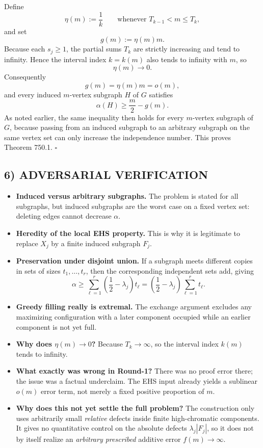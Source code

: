 Define
\[
\eta(m):=\frac1k\qquad\text{whenever }T_{k-1}<m\le T_k,
\]
and set
\[
g(m):=\eta(m)m.
\]
Because each $s_j\ge 1$, the partial sums $T_k$ are strictly increasing and tend to infinity. Hence the interval index $k=k(m)$ also tends to infinity with $m$, so
\[
\eta(m)\to 0.
\]
Consequently
\[
g(m)=\eta(m)m=o(m),
\]
and every induced $m$-vertex subgraph $H$ of $G$ satisfies
\[
\alpha(H)\ge \frac m2-g(m).
\]
As noted earlier, the same inequality then holds for every $m$-vertex subgraph of $G$, because passing from an induced subgraph to an arbitrary subgraph on the same vertex set can only increase the independence number. This proves Theorem 750.1. \hfill $\square$

\subsection*{6) ADVERSARIAL VERIFICATION}

\begin{itemize}
\item \textbf{Induced versus arbitrary subgraphs.} The problem is stated for all subgraphs, but induced subgraphs are the worst case on a fixed vertex set: deleting edges cannot decrease $\alpha$.
\item \textbf{Heredity of the local EHS property.} This is why it is legitimate to replace $X_j$ by a finite induced subgraph $F_j$.
\item \textbf{Preservation under disjoint union.} If a subgraph meets different copies in sets of sizes $t_1,\dots,t_r$, then the corresponding independent sets add, giving
\[
\alpha\ge \sum_{\ell=1}^r\left(\frac12-\lambda_j\right)t_\ell
=\left(\frac12-\lambda_j\right)\sum_{\ell=1}^r t_\ell.
\]
\item \textbf{Greedy filling really is extremal.} The exchange argument excludes any maximizing configuration with a later component occupied while an earlier component is not yet full.
\item \textbf{Why does $\eta(m)\to 0$?} Because $T_k\to\infty$, so the interval index $k(m)$ tends to infinity.
\item \textbf{What exactly was wrong in Round-1?} There was no proof error there; the issue was a factual underclaim. The EHS input already yields a sublinear $o(m)$ error term, not merely a fixed positive proportion of $m$.
\item \textbf{Why does this not yet settle the full problem?} The construction only uses arbitrarily small \emph{relative} defects inside finite high-chromatic components. It gives no quantitative control on the absolute defects $\lambda_j|F_j|$, so it does not by itself realize an \emph{arbitrary prescribed} additive error $f(m)\to\infty$.
\end{itemize}

